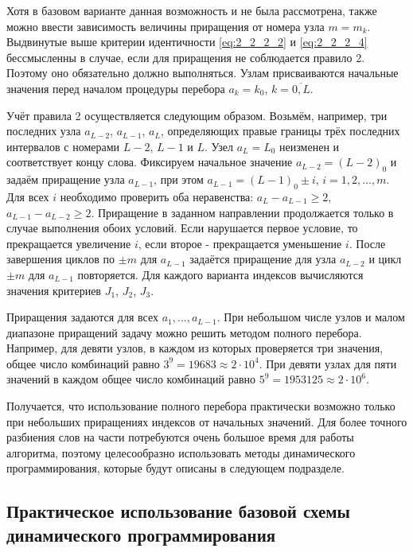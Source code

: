 Хотя в базовом варианте данная возможность и не была рассмотрена, также можно ввести зависимость величины приращения от номера узла $m = m_k$.
Выдвинутые выше критерии идентичности \eqref{eq:2_2_2_2} и \eqref{eq:2_2_2_4} бессмысленны в случае, если для приращения не соблюдается правило 2.
Поэтому оно обязательно должно выполняться.
Узлам присваиваются начальные значения перед началом процедуры перебора $a_k = k_0$, $k = \overline{0, L}$.

Учёт правила 2 осуществляется следующим образом.
Возьмём, например, три последних узла $a_{L-2}$, $a_{L-1}$, $a_L$, определяющих правые границы трёх последних интервалов с номерами $L-2$, $L-1$ и $L$.
Узел $a_L = L_0$ неизменен и соответствует концу слова.
Фиксируем начальное значение $a_{L-2} = (L-2)_0$ и задаём приращение узла $a_{L-1}$, при этом $a_{L-1} = (L-1)_0 \pm i$, $i = 1, 2, \dots, m$.
Для всех $i$ необходимо проверить оба неравенства: $a_L - a_{L-1} \ge 2$, $a_{L-1} - a_{L-2} \ge 2$.
Приращение в заданном направлении продолжается только в случае выполнения обоих условий.
Если нарушается первое условие, то прекращается увеличение $i$, если второе - прекращается уменьшение $i$.
После завершения циклов по $\pm m$ для $a_{L-1}$ задаётся приращение для узла $a_{L-2}$ и цикл $\pm m$ для $a_{L-1}$ повторяется.
Для каждого варианта индексов вычисляются значения критериев $J_1$, $J_2$, $J_3$.

Приращения задаются для всех $a_1, \dots, a_{L-1}$.
При небольшом числе узлов и малом диапазоне приращений задачу можно решить методом полного перебора.
Например, для девяти узлов, в каждом из которых проверяется три значения, общее число комбинаций равно $3^9 = 19683 \approx 2 \cdot 10^4$.
При девяти узлах для пяти значений в каждом общее число комбинаций равно $5^9 = 1953125 \approx 2 \cdot 10^6$.

Получается, что использование полного перебора практически возможно только при небольших приращениях индексов от начальных значений.
Для более точного разбиения слов на части потребуются очень большое время для работы алгоритма, поэтому целесообразно использовать методы динамического программирования, которые будут описаны в следующем подразделе.


\subsection{Практическое использование базовой схемы динамического программирования} \label{sect2_2_4}

